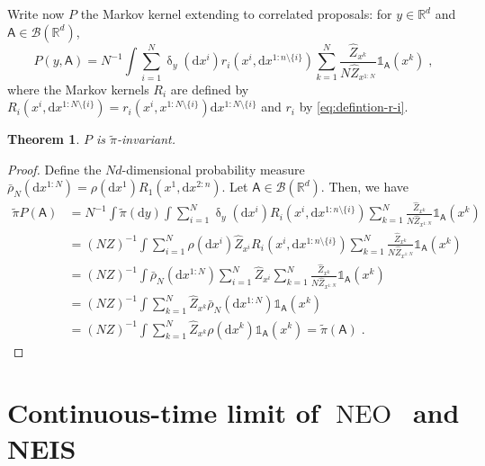 \documentclass{article}
\newtheorem{theorem}{Theorem}
\def\IFIS{\ensuremath{\operatorname{NEO}}}
\def\NEO{{\small \IFIS}}
\def\rmd{\operatorname{d}\hspace{-2pt}}
\def\rset{\mathbb{R}}
\def\rmd{\mathrm{d}}
\def\eqsp{\,}
\def\msa{\mathsf{A}}
\def\borel{\mathcal{B}}
\def\eqsp{\;}
\newcommand{\1}{\mathds{1}}
\newcommand{\indi}[1]{\1_{#1}}
\def\proposal{\rho}
\newcommand{\chunku}[3]{#1^{#2:#3}}
\newcommand{\chunkum}[4]{#1^{#2:#3 \setminus \{#4\}}}
\def\const{Z}
\newcommand{\estConstC}[1]{\widehat{Z}_{#1}}
\def\tpi{\tilde{\pi}}
\def\msa{\mathsf{A}}
\def\rset{\mathbb{R}}
\def\rmd{\mathrm{d}}
\begin{document}
  Write now $P$ the Markov kernel extending to correlated proposals:
  for $y \in\rset^d$ and $\msa \in \mathcal{B}(\rset^d)$,
\begin{equation}
     P(y, \msa) = N^{-1}\int\sum_{i=1}^N \updelta_{y}(\rmd x^i) r_i(x^i, \rmd \chunkum{x}{1}{n}{i}) \sum_{k=1}^N\frac{\estConstC{x^k}}{N\estConstC{\chunku{x}{1}{N}}}\indi{\msa}(x^k)\eqsp,
\end{equation}
where the Markov kernels $R_i$ are defined by $R_i(x^i, \rmd \chunkum{x}{1}{N}{i})= r_i(x^i, \chunkum{x}{1}{N}{i} )\rmd \chunkum{x}{1}{N}{i}$ and $r_i$ by \eqref{eq:defintion-r-i}.
\begin{theorem}
\label{theo:invariant_P_correlated}
$P$ is $\tpi$-invariant.
\end{theorem}
\begin{proof}
Define the $Nd$-dimensional probability measure $\bar{\proposal}_N(\rmd \chunku{x}{1}{N}) = \proposal(\rmd x^1) R_1(x^1, \rmd \chunku{x}{2}{n})$. Let $\msa\in\borel(\rset^d)$. Then, we have
\begin{align*}
\tpi P(\msa) &= N^{-1}\int \tpi(\rmd y) \int\sum_{i=1}^N \updelta_{y}(\rmd x^i) R_i(x^i, \rmd \chunkum{x}{1}{n}{i}) \sum_{k=1}^N\frac{\estConstC{x^k}}{N\estConstC{\chunku{x}{1}{N}}}\indi{\msa}(x^k)\\
&= (N\const)^{-1}\int\sum_{i=1}^N \proposal(\rmd x^i) \estConstC{x^i}R_i(x^i, \rmd \chunkum{x}{1}{n}{i}) \sum_{k=1}^N\frac{\estConstC{x^k}}{N\estConstC{\chunku{x}{1}{N}}}\indi{\msa}(x^k) \\
&= (N\const)^{-1}\int\bar{\proposal}_N(\rmd \chunku{x}{1}{N})\sum_{i=1}^N  \estConstC{x^i}\sum_{k=1}^N\frac{\estConstC{x^k}}{N\estConstC{\chunku{x}{1}{N}}}\indi{\msa}(x^k)
\\&= (N\const)^{-1}\int\sum_{k=1}^N\estConstC{x^k}\bar{\proposal}_N(\rmd \chunku{x}{1}{N})\indi{\msa}(x^k)
\\&= (N\const)^{-1}\int\sum_{k=1}^N\estConstC{x^k}\proposal(\rmd x^k)\indi{\msa}(x^k) = \tpi(\msa)\eqsp.
\end{align*}
\end{proof}

\section{Continuous-time limit of \NEO\ and NEIS}
\label{sec:continuous-time-limits}
\end{document}

